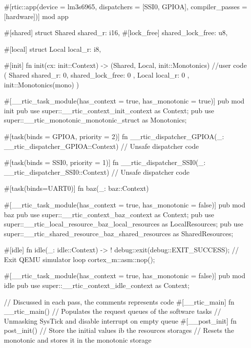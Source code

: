 #[rtic::app(device = lm3s6965, dispatchers = [SSI0, GPIOA], compiler_passes = [hardware])]
mod app {
    #[shared]
    struct Shared {
        shared_r: i16,
        #[lock_free]
        shared_lock_free: u8,
    }

    #[local]
    struct Local {
        local_r: i8,
    }

    #[init]
    fn init(cx: init::Context) -> (Shared, Local, init::Monotonics) {
        //user code
        (
            Shared { shared_r: 0, shared_lock_free: 0 }, 
            Local { local_r: 0 }, 
            init::Monotonics(mono)
        )
    }
    
    #[__rtic_task_module(has_context = true, has_monotonic = true)]
    pub mod init {
        pub use super::__rtic_context_init_context as Context;
        pub use super::__rtic_monotonic_monotonic_struct as Monotonics;
    }

    #[task(binds = GPIOA, priority = 2)]
    fn __rtic_dispatcher_GPIOA(_: __rtic_dispatcher_GPIOA::Context) {
        // Unsafe dispatcher code
    }

    #[task(binds = SSI0, priority = 1)]
    fn __rtic_dispatcher_SSI0(_: __rtic_dispatcher_SSI0::Context) {
        // Unsafe dispatcher code
    }

    #[task(binds=UART0)]
    fn baz(_: baz::Context){
    }

    #[__rtic_task_module(has_context = true, has_monotonic = false)]
    pub mod baz {
        pub use super::__rtic_context_baz_context as Context;
        pub use super::__rtic_local_resource_baz_local_resources as LocalResources;
        pub use super::__rtic_shared_resource_baz_shared_resources as SharedResources;
    }

    #[idle]
    fn idle(_: idle::Context) -> ! {
        debug::exit(debug::EXIT_SUCCESS); // Exit QEMU simulator
        loop {
            cortex_m::asm::nop();
        }
    }

    #[__rtic_task_module(has_context = true, has_monotonic = false)]
    pub mod idle {
        pub use super::__rtic_context_idle_context as Context;
    }

    // Discussed in each pass, the comments represents code
    #[__rtic_main]
    fn __rtic_main() {
        // Populates the request queues of the software tasks
        // Unmasking SysTick and disable interrupt on empty queue
        #[__post_init]
        fn post_init() {
            // Store the initial values ib the resources storages
            // Resets the monotonic and stores it in the monotonic storage
        }
    }
}